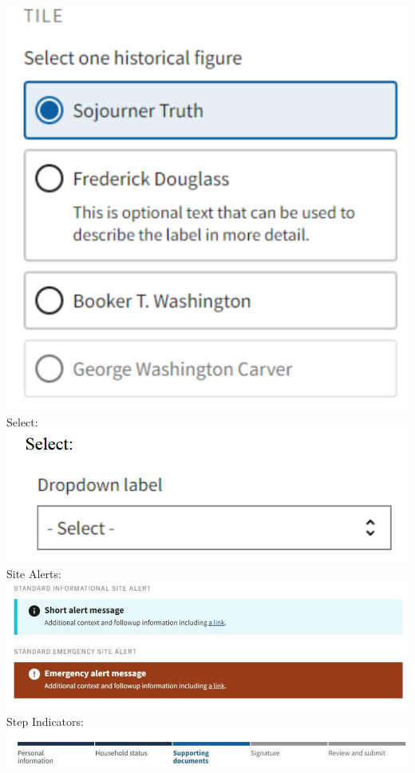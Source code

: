 \documentclass{article}
\begin{document}
\includegraphics{footers} \\
Select: \\
\includegraphics{radiobuttons} \\
Site Alerts: \\
\includegraphics{alerts_site} \\
Step Indicators: \\
\includegraphics{step_indicator} \\
\end{document}
